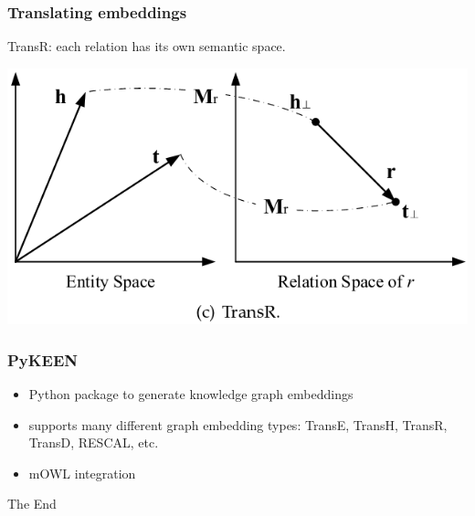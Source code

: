 \documentclass{beamer}
\begin{document}
\begin{frame}
  \frametitle{Translating embeddings}

  TransR: each relation has its own semantic space.
  
  \centerline{\includegraphics[width=.6\textwidth]{transr-figure.png}}
\end{frame}



\begin{frame}
  \frametitle{PyKEEN}
  \begin{itemize}
  \item Python package to generate knowledge graph embeddings
  \item supports many different graph embedding types: TransE, TransH, TransR,
    TransD, RESCAL, etc.

  \item mOWL integration
  \end{itemize}
\end{frame}







\begin{frame}
\Huge{\centerline{The End}}
\end{frame}

\end{document}
